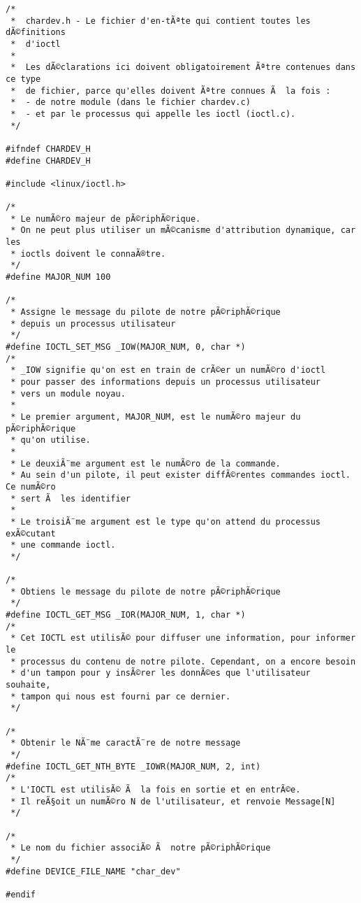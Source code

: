 \documentclass[11pt]{article}
\begin{document}
\begin{verbatim}
/*
 *  chardev.h - Le fichier d'en-tÃªte qui contient toutes les dÃ©finitions
 *  d'ioctl
 *
 *  Les dÃ©clarations ici doivent obligatoirement Ãªtre contenues dans ce type
 *  de fichier, parce qu'elles doivent Ãªtre connues Ã  la fois :
 *  - de notre module (dans le fichier chardev.c)
 *  - et par le processus qui appelle les ioctl (ioctl.c).
 */

#ifndef CHARDEV_H
#define CHARDEV_H

#include <linux/ioctl.h>

/*
 * Le numÃ©ro majeur de pÃ©riphÃ©rique.
 * On ne peut plus utiliser un mÃ©canisme d'attribution dynamique, car les
 * ioctls doivent le connaÃ®tre.
 */
#define MAJOR_NUM 100

/*
 * Assigne le message du pilote de notre pÃ©riphÃ©rique
 * depuis un processus utilisateur
 */
#define IOCTL_SET_MSG _IOW(MAJOR_NUM, 0, char *)
/*
 * _IOW signifie qu'on est en train de crÃ©er un numÃ©ro d'ioctl
 * pour passer des informations depuis un processus utilisateur
 * vers un module noyau.
 *
 * Le premier argument, MAJOR_NUM, est le numÃ©ro majeur du pÃ©riphÃ©rique
 * qu'on utilise.
 *
 * Le deuxiÃ¨me argument est le numÃ©ro de la commande.
 * Au sein d'un pilote, il peut exister diffÃ©rentes commandes ioctl. Ce numÃ©ro
 * sert Ã  les identifier
 *
 * Le troisiÃ¨me argument est le type qu'on attend du processus exÃ©cutant
 * une commande ioctl.
 */

/*
 * Obtiens le message du pilote de notre pÃ©riphÃ©rique
 */
#define IOCTL_GET_MSG _IOR(MAJOR_NUM, 1, char *)
/*
 * Cet IOCTL est utilisÃ© pour diffuser une information, pour informer le
 * processus du contenu de notre pilote. Cependant, on a encore besoin
 * d'un tampon pour y insÃ©rer les donnÃ©es que l'utilisateur souhaite,
 * tampon qui nous est fourni par ce dernier.
 */

/*
 * Obtenir le NÃ¨me caractÃ¨re de notre message
 */
#define IOCTL_GET_NTH_BYTE _IOWR(MAJOR_NUM, 2, int)
/*
 * L'IOCTL est utilisÃ© Ã  la fois en sortie et en entrÃ©e.
 * Il reÃ§oit un numÃ©ro N de l'utilisateur, et renvoie Message[N]
 */

/*
 * Le nom du fichier associÃ© Ã  notre pÃ©riphÃ©rique
 */
#define DEVICE_FILE_NAME "char_dev"

#endif
\end{verbatim}
\end{document}
